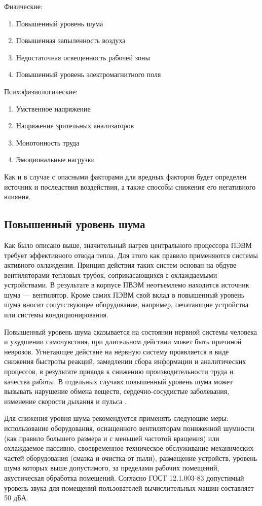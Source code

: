 \documentclass[14pt,oneside,final]{extreport}
\begin{document}
	\noindent Физические:
		\begin{enumerate}[label*=1.\arabic*.]
	 		\item Повышенный уровень шума
	 		\item Повышенная запыленность воздуха
	 		\item Недостаточная освещенность рабочей зоны
	 		\item Повышенный уровень электромагнитного поля
		\end{enumerate}
	Психофизиологические:
		\begin{enumerate}[label*=2.\arabic*.]
			\item Умственное напряжение 
			\item Напряжение зрительных анализаторов
			\item Монотонность труда
			\item Эмоциональные нагрузки
		\end{enumerate}

	Как и в случае с опасными факторами для вредных факторов будет определен источник и последствия воздействия, а также способы снижения его негативного влияния.
	
	\subsection{Повышенный уровень шума}
	Как было описано выше, значительный нагрев центрального процессора ПЭВМ требует эффективного отвода тепла. Для этого как правило применяются системы активного охлаждения. Принцип действия таких систем основан на обдуве вентиляторами тепловых трубок, соприкасающихся с охлаждаемыми устройствами. В результате в корпусе ПВЭМ неотъемлемо находится источник шума --- вентилятор. Кроме самих ПЭВМ свой вклад в повышенный уровень шума вносит сопутствующее оборудование, например, печатающие устройства или системы кондиционирования. 
	
	Повышенный уровень шума сказывается на состоянии нервной системы человека и ухудшении самочувствия, при длительном действии может быть причиной неврозов. Угнетающее действие на нервную систему проявляется в виде снижения быстроты реакций, замедлении сбора информации и аналитических процессов, в результате приводя к снижению производительности труда и качества работы. В отдельных случаях повышенный уровень шума может вызывать нарушение обмена веществ, сердечно-сосудистые заболевания, изменение скорости дыхания и пульса \cite{book:BZD}. 
 
	
	Для снижения уровня шума рекомендуется применять следующие меры: использование оборудования, оснащенного вентиляторам пониженной шумности (как правило большего размера и с меньшей частотой вращения) или охлаждаемое пассивно, своевременное техническое обслуживание механических частей оборудования (смазка и очистка от пыли), размещение устройств, уровень шума которых выше допустимого, за пределами рабочих помещений, акустическая обработка помещений. Согласно ГОСТ 12.1.003-83 допустимый уровень звука для помещений пользователей вычислительных машин составляет 50 дБА.
\end{document}
